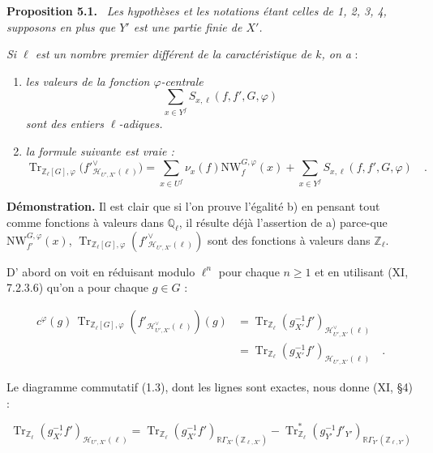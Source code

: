 \documentclass[11pt]{article}
\newenvironment{statement}[1]{\par\medskip\noindent\textbf{#1.}\ }{\par\medskip}
\newcommand{\R}{\mathbb{R}}\newcommand{\RHomCore}{\mathbb{R}\mathrm{Hom}}
\newcommand{\Q}{\mathbb{Q}}
\providecommand{\Tr}{\operatorname{Tr}}
\providecommand{\Tr}{\operatorname{Tr}}
\providecommand{\Tr}{\operatorname{Tr}}
\providecommand{\R}{\mathrm R}
\providecommand{\Tr}{\operatorname{Tr}}
\providecommand{\bZ}{\mathbb Z}
\providecommand{\Tr}{\operatorname{Tr}}
\begin{document}
\begin{statement}{Proposition 5.1}
\emph{Les hypothèses et les notations étant celles de 1, 2, 3, 4, supposons en plus que $Y'$ est une partie finie de $X'$.}

\emph{Si $\ell$ est un nombre premier différent de la caractéristique de $k$, on a} :
\begin{enumerate}[label=\alph*)]
\item \emph{les valeurs de la fonction $\varphi$-centrale}
\[
\sum_{x\in Y^f} S_{x,\ell}(f,f',G,\varphi)
\]
\emph{sont des entiers $\ell$-adiques.}
\item \emph{la formule suivante est vraie :}
\begin{equation}\tag{5.1.1}
\Tr_{\bZ_\ell[G],\varphi}\bigl(f'^\vee_{\mathcal{H}_{U',X'}(\ell)}\bigr)
= \sum_{x\in U^f}\nu_x(f)\mathrm{NW}^{G,\varphi}_f(x)+\sum_{x\in Y^f}S_{x,\ell}(f,f',G,\varphi) \quad .
\end{equation}
\end{enumerate}
\end{statement}

\noindent
\textbf{Démonstration.} Il est clair que si l'on prouve l'égalité b) en pensant tout comme fonctions à valeurs dans $\Q_\ell$, il résulte déjà l'assertion de a) parce-que $\mathrm{NW}^{G,\varphi}_{f'}(x)$, $\Tr_{\bZ_\ell[G],\varphi}(f'^\vee_{\mathcal{H}_{U',X'}(\ell)})$ sont des fonctions à valeurs dans $\bZ_\ell$.

D'%
abord on voit en réduisant modulo $\ell^n$ pour chaque $n \geq 1$ et en utilisant (XI, 7.2.3.6) qu'on a pour chaque $g \in G$ :

\begin{equation}\tag{5.2}
\begin{aligned}
c^\varphi(g) \, \Tr_{\bZ_\ell[G],\varphi}(f'_{\mathcal{H}^\vee_{U',X'}(\ell)})(g)
&= \Tr_{\bZ_\ell}(g_{X'}^{-1}f')_{\mathcal{H}^\vee_{U',X'}(\ell)}\\
&= \Tr_{\bZ_\ell}(g_{X'}^{-1}f')_{\mathcal{H}_{U',X'}(\ell)} \quad .
\end{aligned}
\end{equation}

Le diagramme commutatif (1.3), dont les lignes sont exactes, nous donne (XI, \S4) :

\begin{equation}\tag{5.3}
\Tr_{\bZ_\ell}(g_{X'}^{-1}f')_{\mathcal{H}_{U',X'}(\ell)} = \Tr_{\bZ_\ell}(g_{X'}^{-1}f')_{\R\Gamma_{X'}(\bZ_{\ell,X'})} - \Tr^*_{\bZ_\ell}(g_{Y'}^{-1}f'_{Y'})_{\R\Gamma_{Y'}(\bZ_{\ell,Y'})}
\end{equation}
\end{document}
